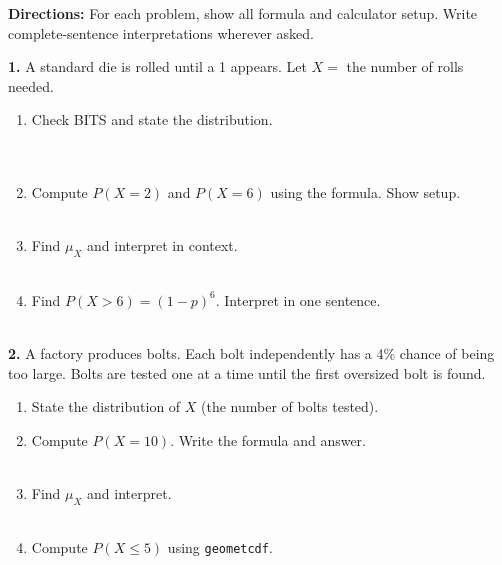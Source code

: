 \documentclass[10pt]{article}
\begin{document}
\namedateperiod

\vspace{0.1in}

\begin{practicebox}
\small
\textbf{Directions:} For each problem, show all formula and calculator setup.
Write complete-sentence interpretations wherever asked.

\vspace{10pt}
\textbf{1.} A standard die is rolled until a 1 appears.
Let $X =$ the number of rolls needed.
\begin{enumerate}[label=(\alph*), leftmargin=2em, itemsep=8pt]
  \item Check BITS and state the distribution.\\
        \writeline\\[1pt]\writeline\\[1pt]\writeline
  \item Compute $P(X = 2)$ and $P(X = 6)$ using the formula. Show setup.\\
        \writeline\\[1pt]\writeline
  \item Find $\mu_X$ and interpret in context.\\
        \writeline\\[1pt]\writeline
  \item Find $P(X > 6) = (1 - p)^6$. Interpret in one sentence.\\
        \writeline\\[1pt]\writeline
\end{enumerate}

\vspace{8pt}
\textbf{2.} A factory produces bolts. Each bolt independently has a 4\% chance
of being too large. Bolts are tested one at a time until the first oversized bolt
is found.
\begin{enumerate}[label=(\alph*), leftmargin=2em, itemsep=8pt]
  \item State the distribution of $X$ (the number of bolts tested).\\
        \blank{5cm}
  \item Compute $P(X = 10)$. Write the formula and answer.\\
        \writeline\\[1pt]\writeline
  \item Find $\mu_X$ and interpret.\\
        \writeline\\[1pt]\writeline
  \item Compute $P(X \le 5)$ using \texttt{geometcdf}.\\
        \writeline
\end{enumerate}


\end{practicebox}
\end{document}

